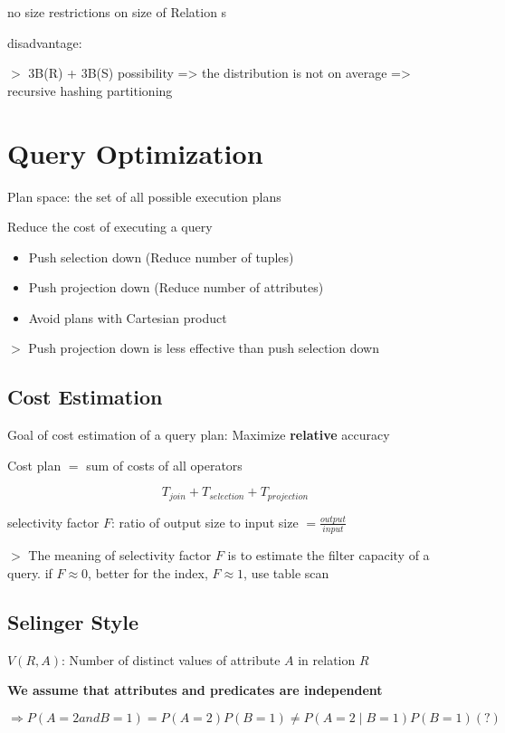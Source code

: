 \documentclass[12pt,a4paper]{article}
\newcommand{\remark}[1]{
    $>$ {\color{blue} #1}
}
\begin{document}
no size restrictions on size of Relation s

disadvantage: 

$>$ 3B(R) + 3B(S) possibility => the distribution is not on average => recursive hashing partitioning


\section*{Query Optimization}

Plan space: the set of all possible execution plans

Reduce the cost of executing a query

\begin{itemize}
    \item Push selection down (Reduce number of tuples)
    \item Push projection down (Reduce number of attributes)
    \item Avoid plans with Cartesian product
\end{itemize}

\remark{Push projection down is less effective than push selection down}

\subsection*{Cost Estimation}

Goal of cost estimation of a query plan: Maximize \textbf{relative} accuracy

Cost plan $=$ sum of costs of all operators

\[T_{join} + T_{selection} + T_{projection}\]

selectivity factor $F$: ratio  of output size to input size $= \frac{output}{input}$

\remark{The meaning of selectivity factor $F$ is to estimate the filter capacity of a query. if $F \approx 0$, better for the index, $F \approx 1$, use table scan}

\subsection*{Selinger Style}

$V(R,A)$: Number of distinct values of attribute $A$ in relation $R$

\textbf{We assume that attributes and predicates are independent}

\[\Rightarrow P(A=2and B=1) = P(A=2)P(B=1) \neq P(A=2 \mid B=1)P(B=1) (?)\]
\end{document}
